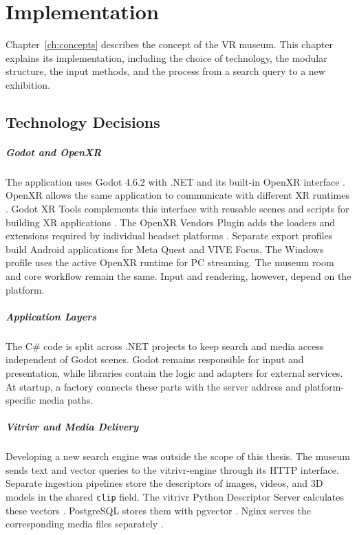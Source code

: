 \chapter{Implementation}
\label{ch:implementation}

\begingroup
\setaftersecskip{6pt}
\setlength{\emergencystretch}{2em}
Chapter~\ref{ch:concepts} describes the concept of the VR museum. This chapter explains its implementation, including the choice of technology, the modular structure, the input methods, and the process from a search query to a new exhibition.

\section{Technology Decisions}
\label{sec:implementation-technology}

\paragraph{Godot and OpenXR} The application uses Godot 4.6.2 with .NET and its built-in OpenXR interface \citep{godotOpenXR,godot462}. OpenXR allows the same application to communicate with different XR runtimes \citep{khronosOpenXR}. Godot XR Tools complements this interface with reusable scenes and scripts for building XR applications \citep{godotXRTools}. The OpenXR Vendors Plugin adds the loaders and extensions required by individual headset platforms \citep{godotOpenXRVendors}. Separate export profiles build Android applications for Meta Quest and VIVE Focus. The Windows profile uses the active OpenXR runtime for PC streaming. The museum room and core workflow remain the same. Input and rendering, however, depend on the platform.

\paragraph{Application Layers} The C\# code is split across .NET projects to keep search and media access independent of Godot scenes. Godot remains responsible for input and presentation, while libraries contain the logic and adapters for external services. At startup, a factory connects these parts with the server address and platform-specific media paths.

\paragraph{Vitrivr and Media Delivery} Developing a new search engine was outside the scope of this thesis. The museum sends text and vector queries to the vitrivr-engine through its HTTP interface. Separate ingestion pipelines store the descriptors of images, videos, and 3D models in the shared \texttt{clip} field. The vitrivr Python Descriptor Server calculates these vectors \citep{vitrivrPythonDescriptorServer2026}. PostgreSQL stores them with pgvector \citep{pgvector2026}. Nginx serves the corresponding media files separately \citep{nginxStaticContent2026}.

